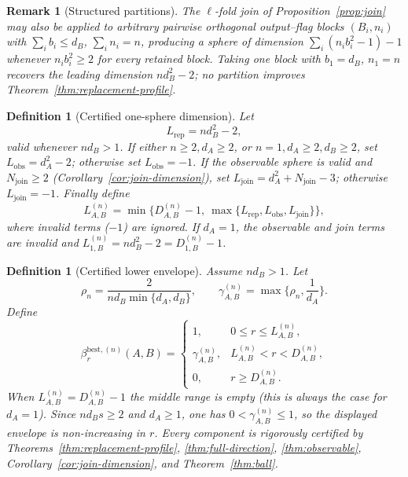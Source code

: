 \documentclass[11pt,a4paper]{article}
\newtheorem{definition}[theorem]{Definition}
\newtheorem{remark}[theorem]{Remark}
\begin{document}
\begin{remark}[Structured partitions]
\label{rem:partitions}
The $\ell$-fold join of Proposition~\ref{prop:join} may also be applied to arbitrary pairwise orthogonal output--flag blocks $(B_i,n_i)$ with $\sum_ib_i\le d_B$, $\sum_in_i=n$, producing a sphere of dimension $\sum_i(n_ib_i^2-1)-1$ whenever $n_ib_i^2\ge2$ for every retained block. Taking one block with $b_1=d_B$, $n_1=n$ recovers the leading dimension $nd_B^2-2$; no partition improves Theorem~\ref{thm:replacement-profile}.
\end{remark}

\begin{definition}[Certified one-sphere dimension]
\label{def:one-sphere}
Let
\[
L_{\mathrm{rep}}=nd_B^2-2,
\]
valid whenever $nd_B>1$. If either $n\ge2,d_A\ge2$, or $n=1,d_A\ge2,d_B\ge2$, set $L_{\mathrm{obs}}=d_A^2-2$; otherwise set $L_{\mathrm{obs}}=-1$. If the observable sphere is valid and $N_{\mathrm{join}}\ge2$ (Corollary~\ref{cor:join-dimension}), set $L_{\mathrm{join}}=d_A^2+N_{\mathrm{join}}-3$; otherwise $L_{\mathrm{join}}=-1$. Finally define
\[
L_{A,B}^{(n)}
=\min\Big\{D_{A,B}^{(n)}-1,\ \max\{L_{\mathrm{rep}},L_{\mathrm{obs}},L_{\mathrm{join}}\}\Big\},
\]
where invalid terms ($-1$) are ignored. If $d_A=1$, the observable and join terms are invalid and $L_{1,B}^{(n)}=nd_B^2-2=D_{1,B}^{(n)}-1$.
\end{definition}

\begin{definition}[Certified lower envelope]
\label{def:beta-best}
Assume $nd_B>1$. Let
\[
\rho_n=\frac{2}{nd_B\min\{d_A,d_B\}},\qquad
\gamma_{A,B}^{(n)}=\max\Big\{\rho_n,\frac1{d_A}\Big\}.
\]
Define
\[
\beta_r^{\mathrm{best},(n)}(A,B)=
\begin{cases}
1,&0\le r\le L_{A,B}^{(n)},\\[3pt]
\gamma_{A,B}^{(n)},&L_{A,B}^{(n)}<r<D_{A,B}^{(n)},\\[6pt]
0,&r\ge D_{A,B}^{(n)}.
\end{cases}
\]
When $L_{A,B}^{(n)}=D_{A,B}^{(n)}-1$ the middle range is empty (this is always the case for $d_A=1$). Since $nd_Bs\ge2$ and $d_A\ge1$, one has $0<\gamma_{A,B}^{(n)}\le1$, so the displayed envelope is non-increasing in $r$. Every component is rigorously certified by Theorems~\ref{thm:replacement-profile}, \ref{thm:full-direction}, \ref{thm:observable}, Corollary~\ref{cor:join-dimension}, and Theorem~\ref{thm:ball}.
\end{definition}
\end{document}
